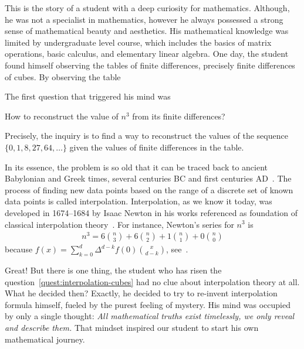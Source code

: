 This is the story of a student with a deep curiosity for mathematics.
Although, he was not a specialist in mathematics, however he always possessed a strong sense of mathematical
beauty and aesthetics.
His mathematical knowledge was limited by undergraduate level course, which includes the basics of
matrix operations, basic calculus, and elementary linear algebra.
One day, the student found himself observing the tables of finite differences, precisely finite differences of cubes.
By observing the table

The first question that triggered his mind was
\begin{question}
    \label{quest:interpolation-cubes}
    How to reconstruct the value of $n^3$ from its finite differences?
\end{question}
Precisely, the inquiry is to find a way to reconstruct the values of the sequence $\{0, 1, 8, 27, 64, \ldots\}$
given the values of finite differences in the table.

In its essence, the problem is so old that it can be traced back to ancient Babylonian and Greek times,
several centuries BC and first centuries AD~\cite{gautschi2012interpolation}.
The process of finding new data points based on the range of a discrete set
of known data points is called interpolation.
Interpolation, as we know it today, was developed in 1674--1684 by Isaac Newton
in his works referenced as foundation of classical interpolation theory~\cite{meijering2002chronology}.
For instance, Newton's series for $n^3$ is
\begin{align*}
    n^3 = 6 \binom{n}{3} + 6\binom{n}{2} + 1 \binom{n}{1} + 0\binom{n}{0}
\end{align*}
because $f(x) = \sum_{k=0}^{d} \Delta^{d-k} f(0) \binom{x}{d-k}$, see~\cite[~p. 190]{graham1994concrete}.

Great!
But there is one thing, the student who has risen the question~\eqref{quest:interpolation-cubes}
had no clue about interpolation theory at all.
What he decided then?
Exactly, he decided to try to re-invent interpolation formula himself,
fueled by the purest feeling of mystery.
His mind was occupied by only a single thought:
\textit{All mathematical truths exist timelessly, we only reveal and describe them.}
That mindset inspired our student to start his own mathematical journey.

